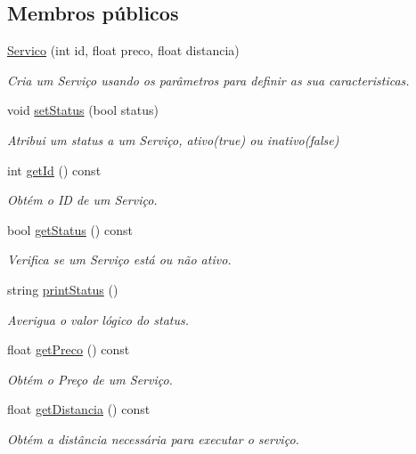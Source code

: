 \subsection*{Membros públicos}
\begin{DoxyCompactItemize}
\item 
\hyperlink{class_servico_ad6f73e597087d194f6a768f5b49174a4}{Servico} (int id, float preco, float distancia)
\begin{DoxyCompactList}\small\item\em Cria um Serviço usando os parâmetros para definir as sua caracteristicas. \end{DoxyCompactList}\item 
void \hyperlink{class_servico_a9a12bcdd4adb4dcb9718f6ccc4320e2e}{set\+Status} (bool status)
\begin{DoxyCompactList}\small\item\em Atribui um status a um Serviço, ativo(true) ou inativo(false) \end{DoxyCompactList}\item 
int \hyperlink{class_servico_aeedaf81332746435112616620626f8a0}{get\+Id} () const 
\begin{DoxyCompactList}\small\item\em Obtém o I\+D de um Serviço. \end{DoxyCompactList}\item 
bool \hyperlink{class_servico_ac4da7c7738bc5d0a186676ed72eb3f7f}{get\+Status} () const 
\begin{DoxyCompactList}\small\item\em Verifica se um Serviço está ou não ativo. \end{DoxyCompactList}\item 
string \hyperlink{class_servico_aca8339e45a5072b69f538d9a6791084e}{print\+Status} ()
\begin{DoxyCompactList}\small\item\em Averigua o valor lógico do status. \end{DoxyCompactList}\item 
float \hyperlink{class_servico_a7eea58bc4405f61335bddf3fc25bfafa}{get\+Preco} () const 
\begin{DoxyCompactList}\small\item\em Obtém o Preço de um Serviço. \end{DoxyCompactList}\item 
float \hyperlink{class_servico_a07f492f6984fa33781adbedafe3d7977}{get\+Distancia} () const 
\begin{DoxyCompactList}\small\item\em Obtém a distância necessária para executar o serviço. \end{DoxyCompactList}\item 

\end{DoxyCompactItemize}
